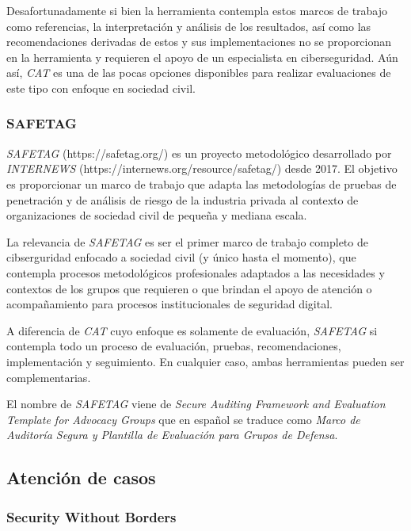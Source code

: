 \documentclass[12pt]{caltech_thesis}
\begin{document}
Desafortunadamente si bien la herramienta contempla estos marcos de trabajo como referencias, la interpretación y análisis de los resultados, así como las recomendaciones derivadas de estos y sus implementaciones no se proporcionan en la herramienta y requieren el apoyo de un especialista en ciberseguridad. Aún así, \textit{CAT} es una de las pocas opciones disponibles para realizar evaluaciones de este tipo con enfoque en sociedad civil.

\subsubsection{SAFETAG}

\textit{SAFETAG} (https://safetag.org/) es un proyecto metodológico desarrollado por \textit{INTERNEWS} (https://internews.org/resource/safetag/) desde 2017. El objetivo es proporcionar un marco de trabajo que adapta las metodologías de pruebas de penetración y de análisis de riesgo de la industria privada al contexto de organizaciones de sociedad civil de pequeña y mediana escala. 

La relevancia de \textit{SAFETAG} es ser el primer marco de trabajo completo de cibserguridad enfocado a sociedad civil (y único hasta el momento), que contempla procesos metodológicos profesionales adaptados a las necesidades y contextos de los grupos que requieren o que brindan el apoyo de atención o acompañamiento para procesos institucionales de seguridad digital.

A diferencia de \textit{CAT} cuyo enfoque es solamente de evaluación, \textit{SAFETAG} si contempla todo un proceso de evaluación, pruebas, recomendaciones, implementación y seguimiento.  En cualquier caso, ambas herramientas pueden ser complementarias.

El nombre de \textit{SAFETAG} viene de \textit{Secure Auditing Framework and Evaluation Template for Advocacy Groups} que en español se traduce como \textit{Marco de Auditoría Segura y Plantilla de Evaluación para Grupos de Defensa}. 

\subsection{Atención de casos}

\subsubsection{Security Without Borders}
\end{document}

